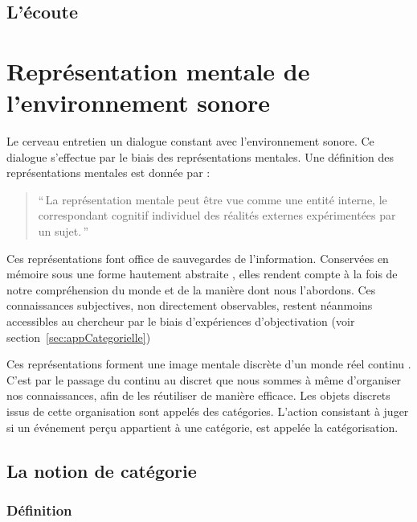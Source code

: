 \subsection{L'écoute}

\section{Représentation mentale de l'environnement sonore}

Le cerveau entretien un dialogue constant avec l'environnement sonore. Ce dialogue s'effectue par le biais des représentations mentales. Une définition des représentations mentales est donnée par \citep{houde1998vocabulaire}:

\begin{quote}
``\,La représentation mentale peut être vue comme une entité interne, le correspondant cognitif individuel des réalités externes expérimentées par un sujet.\,''
\end{quote}

Ces représentations font office de sauvegardes de l'information. Conservées en mémoire sous une forme hautement abstraite \citep[p. ??]{mcadams1994penser}, elles rendent compte à la fois de notre compréhension du monde et de la manière dont nous l'abordons. Ces connaissances subjectives, non directement observables, restent néanmoins accessibles au chercheur par le biais d'expériences d'objectivation (voir section~\ref{sec:appCategorielle})
 
Ces représentations forment une image mentale discrète d'un monde réel continu \citep{houde1998vocabulaire}. C'est par le passage du continu au discret que nous sommes à même d'organiser nos connaissances, afin de les réutiliser de manière efficace. Les objets discrets issus de cette organisation sont appelés des catégories. L'action consistant à juger si un événement perçu appartient à une catégorie, est appelée la catégorisation.

\subsection{La notion de catégorie}

\subsubsection{Définition}

 \\

